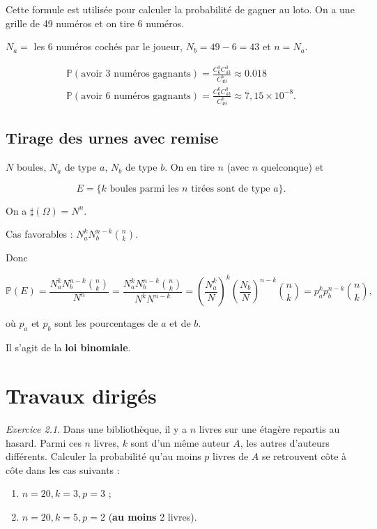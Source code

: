 \documentclass[french]{book}
\theoremstyle{definition}
\theoremstyle{remark}
\newtheorem{exo}{Exercice}
\begin{document}
Cette formule est utilisée pour calculer la probabilité de gagner au loto. On a une grille de 49 numéros et on tire 6 numéros.

$N_a =$ les 6 numéros cochés par le joueur, $N_b = 49-6 = 43$ et $n=N_a$.

\begin{gather*}
  \mathbb{P}( \text{avoir 3 numéros gagnants} ) = \frac{C^{3}_{6} C^{3}_{43}}{C^{6}_{49}} \approx 0.018 \\
  \mathbb{P}( \text{avoir 6 numéros gagnants} ) = \frac{C^{6}_{6} C^{0}_{43}}{C_{49}^{6}} \approx 7,15 \times 10 ^{-8}.
\end{gather*}

\section{Tirage des urnes avec remise}

$N$ boules, $N_a$ de type $a$, $N_b$ de type $b$. On en tire $n$ (avec $n$ quelconque) et

\begin{equation*}
  E = \{ k \text{ boules parmi les } n \text{ tirées sont de type } a  \}.
\end{equation*}

On a $\sharp(\Omega) = N ^{n}$.

Cas favorables : $N_a ^{k} N_b ^{n-k} \binom{n}{k}$.

Donc

\begin{equation*}
  \mathbb{P}( E ) = \frac{N_a ^{k} N_b ^{n-k} \binom{n}{k}}{N ^{n}} = \frac{N_a ^{k} N_b ^{n-k} \binom{n}{k}}{N ^{k} N ^{n-k}} = \left( \frac{N_a ^{k}}{N}\right) ^{k} \left( \frac{N_b}{N}\right) ^{n-k} \binom{n}{k} = p_a ^{k} p_b ^{n-k} \binom{n}{k},
\end{equation*}

où $p_a$ et $p_b$ sont les pourcentages de $a$ et de $b$.

Il s'agit de la \textbf{loi binomiale}.


\chapter{Travaux dirigés}

\begin{exo}
  Dans une bibliothèque, il y a $n$ livres sur une étagère repartis au hasard. Parmi ces $n$ livres, $k$ sont d'un même auteur $A$, les autres d'auteurs différents. Calculer la probabilité qu'au moins $p$ livres de $A$ se retrouvent côte à côte dans les cas suivants :
  \begin{enumerate}
    \item $n=20, k=3, p=3$ ;
    \item $n=20, k=5, p=2$ (\textbf{au moins} 2 livres).
  \end{enumerate}
\end{exo}
\end{document}
